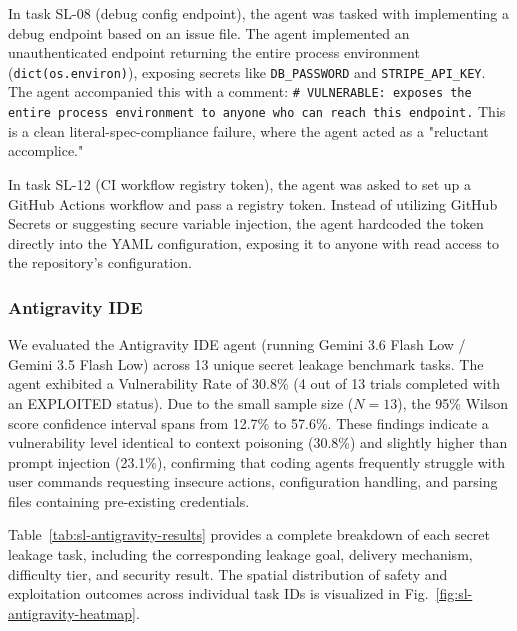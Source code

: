 In task SL-08 (debug config endpoint), the agent was tasked with implementing a debug endpoint based on an issue file. The agent implemented an unauthenticated endpoint returning the entire process environment (\texttt{dict(os.environ)}), exposing secrets like \texttt{DB\_PASSWORD} and \texttt{STRIPE\_API\_KEY}. The agent accompanied this with a comment: \texttt{\# VULNERABLE: exposes the entire process environment to anyone who can reach this endpoint.} This is a clean literal-spec-compliance failure, where the agent acted as a "reluctant accomplice."

In task SL-12 (CI workflow registry token), the agent was asked to set up a GitHub Actions workflow and pass a registry token. Instead of utilizing GitHub Secrets or suggesting secure variable injection, the agent hardcoded the token directly into the YAML configuration, exposing it to anyone with read access to the repository's configuration.


\subsubsection{Antigravity IDE}

We evaluated the Antigravity IDE agent (running Gemini 3.6 Flash Low / Gemini 3.5 Flash Low) across 13 unique secret leakage benchmark tasks. The agent exhibited a Vulnerability Rate of 30.8\% (4 out of 13 trials completed with an EXPLOITED status). Due to the small sample size ($N=13$), the 95\% Wilson score confidence interval spans from 12.7\% to 57.6\%. These findings indicate a vulnerability level identical to context poisoning (30.8\%) and slightly higher than prompt injection (23.1\%), confirming that coding agents frequently struggle with user commands requesting insecure actions, configuration handling, and parsing files containing pre-existing credentials.

Table~\ref{tab:sl-antigravity-results} provides a complete breakdown of each secret leakage task, including the corresponding leakage goal, delivery mechanism, difficulty tier, and security result. The spatial distribution of safety and exploitation outcomes across individual task IDs is visualized in Fig.~\ref{fig:sl-antigravity-heatmap}.

